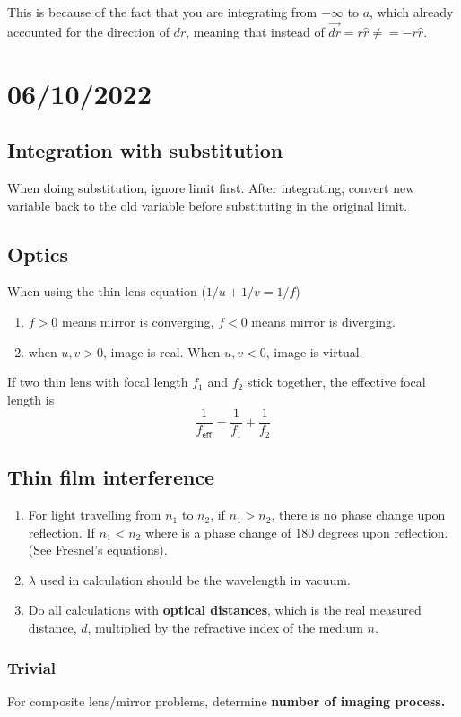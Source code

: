 This is because of the fact that you are integrating from $-\infty$ to $a$, which already accounted for the direction of $dr$, meaning that instead of $\vec{dr}=r \hat{r}\neq =-r \hat{r}$. 


\section{06/10/2022}
\subsection{Integration with substitution}
When doing substitution, ignore limit first. After integrating, convert new variable back to the old variable before substituting in the original limit. 

\subsection{Optics}
When using the thin lens equation ($1/u+1/v=1/f$)

\begin{enumerate}
    \item $f>0$ means mirror is converging, $f<0$ means mirror is diverging. 
    \item when $u,v>0$, image is real. When $u,v<0$, image is virtual.
\end{enumerate}

If two thin lens with focal length $f_1$ and $f_2$ stick together, the effective focal length is 
\begin{equation}
    \frac{1}{f_\textsf{eff}}=\frac{1}{f_1}+\frac{1}{f_2}
\end{equation}

\subsection{Thin film interference}
\begin{enumerate}
    \item For light travelling from $n_1$ to $n_2$, if $n_1>n_2$, there is no phase change upon reflection. If $n_1<n_2$ where is a phase change of 180 degrees upon reflection. (See Fresnel's equations).
    \item  $\lambda$ used in calculation should be the wavelength in vacuum. 
    \item Do all calculations with \textbf{optical distances}, which is the real measured distance, $d$, multiplied by the refractive index of the medium $n$. 
\end{enumerate}


\subsubsection{Trivial}
For composite lens/mirror problems, determine \textbf{number of imaging process.}
